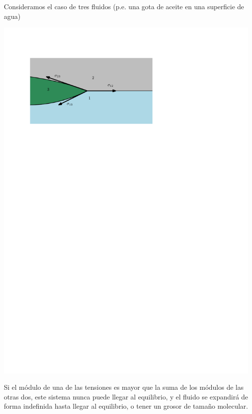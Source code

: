 Consideramos el caso de tres fluidos (p.e. una gota de aceite en una superficie de agua)
\begin{center}
\includegraphics{TeX_files/chapter01-Introduccion/tresFluidos}
\end{center}
Si el m\'odulo de una de las tensiones es mayor que la suma de los m\'odulos de las otras dos, este sistema nunca
puede llegar al equilibrio, y el fluido se expandir\'a de forma indefinida hasta llegar al equilibrio, o tener
un grosor de tama\~no molecular.

